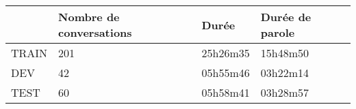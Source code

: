 \begin{table}[]
\begin{tabular}{|l|l|l|l|}
\hline
      & Nombre de conversations & Durée    & Durée de parole \\ \hline
TRAIN & 201                     & 25h26m35 & 15h48m50        \\ \hline
DEV   & 42                      & 05h55m46 & 03h22m14        \\ \hline
TEST  & 60                      & 05h58m41 & 03h28m57        \\ \hline
\end{tabular}
\label{tab:repartitionEnSets}
\end{table}
